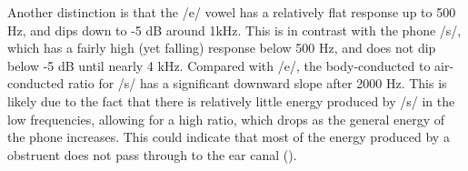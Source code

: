 Another distinction is that the /e/ vowel has a relatively flat response up to 500 Hz, and dips down to -5 dB around 1kHz.  This is in contrast with the phone /s/, which has a fairly high (yet falling) response below 500 Hz, and does not dip below -5 dB until nearly 4 kHz.  Compared with /e/, the body-conducted to air-conducted ratio for /s/ has a significant downward slope after 2000 Hz.  This is likely due to the fact that there is relatively little energy produced by /s/ in the low frequencies, allowing for a high ratio, which drops as the general energy of the phone increases.  This could indicate that most of the energy produced by a obstruent does not pass through to the ear canal (\cite{reinfeldt:10}).

\DIFdelbegin %
{%
}
\DIFdelend %

